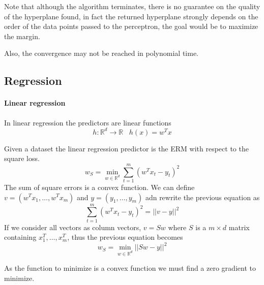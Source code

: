 Note that although the algorithm terminates, there is no guarantee on 
the quality of the hyperplane found, in fact the returned hyperplane
strongly depends on the order of the data points passed to the perceptron, 
the goal would be to maximize the margin.

Also, the convergence may not be reached in polynomial time.

\subsection{Regression}

\paragraph{Linear regression}
In linear regression the predictors are linear functions
$$h : \mathbb{R}^d \rightarrow \mathbb{R}\;\;\; h(x) = w^Tx$$

Given a dataset the linear regression predictor is the ERM 
with respect to the square loss.
$$w_S = \min_{w \in \mathbb{R}^d} \sum_{t=1}^m (w^Tx_t - y_t)^2$$
The sum of square errors is a convex function. We can 
define $v = (w^Tx_1,\dots, w^Tx_m)$ and $y = (y_1, \dots, y_m)$ adn 
rewrite the previous equation as 
$$\sum_{t=1}^m (w^Tx_t - y_t)^2 = ||v - y||^2$$
If we consider all vectors as column vectors, $v = Sw$ where $S$ is a 
$m\times d$ matrix containing $x_1^T, \dots, x_m^T$, 
thus the previous equation becomes 
$$w_S = \min_{w \in \mathbb{R}^d} ||Sw - y||^2$$

As the function to minimize is a convex function we must find a zero 
gradient to minimize.